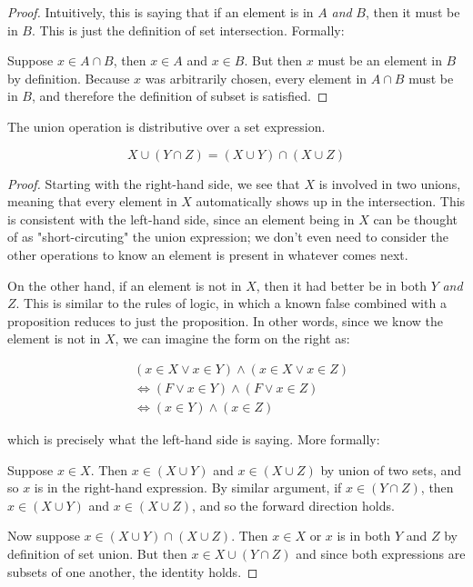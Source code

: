 \documentclass{standalone}
\begin{document}
\begin{proof}
  Intuitively, this is saying that if an element is in $A$ \emph{and} $B$, then
  it must be in $B$. This is just the definition of set intersection. Formally:

  Suppose $x \in A \cap B$, then $x \in A$ and $x \in B$. But then $x$ must be
  an element in $B$ by definition. Because $x$ was arbitrarily chosen, every
  element in $A \cap B$ must be in $B$, and therefore the definition of subset
  is satisfied.
\end{proof}

\begin{theorem}
  The union operation is distributive over a set expression.

  \[
    X \cup (Y \cap Z) = (X \cup Y) \cap (X \cup Z)
  \]
\end{theorem}

\begin{proof}
  Starting with the right-hand side, we see that $X$ is involved in two unions,
  meaning that every element in $X$ automatically shows up in the intersection.
  This is consistent with the left-hand side, since an element being in $X$ can
  be thought of as "short-circuting" the union expression; we don't even need to
  consider the other operations to know an element is present in whatever comes
  next.

  On the other hand, if an element is not in $X$, then it had better be in both
  $Y$ \emph{and} $Z$. This is similar to the rules of logic, in which a known
  false combined with a proposition reduces to just the proposition. In other
  words, since we know the element is not in $X$, we can imagine the form on
  the right as:

  \begin{align*}
    &(x \in X \lor x \in Y) \land (x \in X \lor x \in Z) \\
    &\iff (F \lor x \in Y) \land (F \lor x \in Z) \\
    &\iff (x \in Y) \land (x \in Z)
  \end{align*}

  which is precisely what the left-hand side is saying. More formally:

  Suppose $x \in X$. Then $x \in (X \cup Y)$ and $x \in (X \cup Z)$ by union of
  two sets, and so $x$ is in the right-hand expression. By similar argument, if
  $x \in (Y \cap Z)$, then $x \in (X \cup Y)$ and $x \in (X \cup Z)$, and so
  the forward direction holds.

  Now suppose $x \in (X \cup Y) \cap (X \cup Z)$. Then $x \in X$ or $x$ is in
  both $Y$ and $Z$ by definition of set union. But then $x \in X \cup (Y \cap Z)$
  and since both expressions are subsets of one another, the identity holds.
\end{proof}
\end{document}
